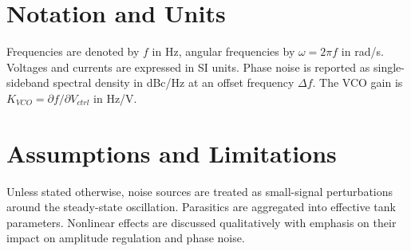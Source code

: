 \section{Notation and Units}
Frequencies are denoted by \(f\) in Hz, angular frequencies by \(\omega = 2\pi f\) in rad/s. Voltages and currents are expressed in SI units. Phase noise is reported as single-sideband spectral density in dBc/Hz at an offset frequency \(\Delta f\). The VCO gain is \(K_{VCO} = \partial f/\partial V_{ctrl}\) in Hz/V.

\section{Assumptions and Limitations}
Unless stated otherwise, noise sources are treated as small-signal perturbations around the steady-state oscillation. Parasitics are aggregated into effective tank parameters. Nonlinear effects are discussed qualitatively with emphasis on their impact on amplitude regulation and phase noise.


